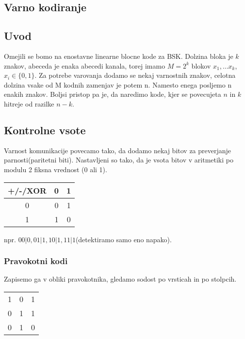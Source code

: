 \documentclass{article}
\begin{document}
\begin{multicols}{2}
	\section{Varno kodiranje}

	\subsection{Uvod}
	Omejili se bomo na enostavne linearne blocne kode za BSK. Dolzina bloka je $k$ znakov, abeceda je enaka abecedi
	kanala, torej imamo $M=2^k$ blokov $x_1, \dots x_k$, $x_i \in \{0, 1\}$. Za potrebe varovanja dodamo se nekaj
	varnostnih znakov, celotna dolzina vsake od M kodnih zamenjav je potem n. Namesto enega posljemo n enakih znakov.
	Boljsi pristop pa je, da naredimo kode, kjer se povecujeta $n$ in $k$ hitreje od razilke $n -k$.

	\subsection{Kontrolne vsote}
	Varnost komunikacije povecamo tako, da dodamo nekaj bitov za preverjanje parnosti(paritetni biti).
	Nastavljeni so tako, da je vsota bitov v aritmetiki po modulu 2 fiksna vrednost (0 ali 1).\\
	\begin{center}
		\begin{tabular}{ |c|c|c| }
			\hline
			+/-/XOR & 0 & 1 \\
			\hline
			0       & 0 & 1 \\
			1       & 1 & 0 \\
			\hline
		\end{tabular}
	\end{center}

	npr. $00|0, 01|1, 10|1, 11|1$(detektiramo samo eno napako).

	\subsubsection{Pravokotni kodi}
	Zapisemo ga v obliki pravokotnika, gledamo sodost po vrsticah in po stolpcih.

	\begin{center}
		\begin{tabular}{ |c|cc| }
			\hline
			1 & 0 & 1 \\
			0 & 1 & 1 \\
			\hline
			0 & 1 & 0 \\
			\hline
		\end{tabular}
	\end{center}


\end{multicols}
\end{document}
